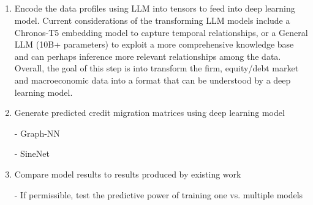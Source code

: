 \documentclass[10pt]{article}
\begin{document}
\begin{multicols*}{2}
\subsection{}
\begin{enumerate}
	\item Encode the data profiles using LLM into tensors to feed into deep learning model.
	Current considerations of the transforming LLM models include a Chronos-T5 embedding model to capture temporal relationships, or a General LLM (10B+ parameters) to exploit a more comprehensive knowledge base and can perhaps inference more relevant relationships among the data.
	Overall, the goal of this step is into transform the firm, equity/debt market and macroeconomic data into a format that can be understood by a deep learning model. 
	\item Generate predicted credit migration matrices using deep learning model
	
	- Graph-NN 

	- SineNet

	\item Compare model results to results produced by existing work
	
	- If permissible, test the predictive power of training one vs. multiple models 
\end{enumerate}

%
%
%	

\end{multicols*}

\clearpage


	
\end{document}
